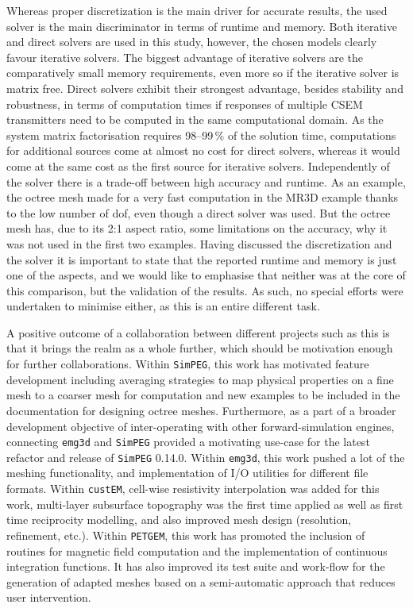 \documentclass[onecolumn,extra,camera]{gji}
\newcommand{\emg}[2]{\texttt{emg#1#2}\xspace}
\newcommand{\simpeg}{\texttt{SimPEG}\xspace}
\newcommand{\custem}{\texttt{custEM}\xspace}
\newcommand{\petgem}{\texttt{PETGEM}\xspace}
\begin{document}
Whereas proper discretization is the main driver for accurate results, the used solver is the main discriminator in terms of runtime and memory. Both iterative and direct solvers are used in this study, however, the chosen models clearly favour iterative solvers. The biggest advantage of iterative solvers are the comparatively small memory requirements, even more so if the iterative solver is matrix free. Direct solvers exhibit their strongest advantage, besides stability and robustness, in terms of computation times if responses of multiple CSEM transmitters need to be computed in the same computational domain. As the system matrix factorisation requires 98--99\,\% of the solution time, computations for additional sources come at almost no cost for direct solvers, whereas it would come at the same cost as the first source for iterative solvers. Independently of the solver there is a trade-off between high accuracy and runtime. As an example, the octree mesh made for a very fast computation in the MR3D example thanks to the low number of dof, even though a direct solver was used. But the octree mesh has, due to its 2:1 aspect ratio, some limitations on the accuracy, why it was not used in the first two examples. Having discussed the discretization and the solver it is important to state that the reported runtime and memory is just one of the aspects, and we would like to emphasise that neither was at the core of this comparison, but the validation of the results. As such, no special efforts were undertaken to minimise either, as this is an entire different task.

A positive outcome of a collaboration between different projects such as this is that it brings the realm as a whole further, which should be motivation enough for further collaborations. Within \simpeg, this work has motivated feature development including averaging strategies to map physical properties on a fine mesh to a coarser mesh for computation and new examples to be included in the documentation for designing octree meshes. Furthermore, as a part of a broader development objective of inter-operating with other forward-simulation engines, connecting \emg3d and \simpeg provided a motivating use-case for the latest refactor and release of \simpeg 0.14.0. Within \emg3d, this work pushed a lot of the meshing functionality, and implementation of I/O utilities for different file formats. Within \custem, cell-wise resistivity interpolation was added for this work, multi-layer subsurface topography was the first time applied as well as first time reciprocity modelling, and also improved mesh design (resolution, refinement, etc.). Within \petgem, this work has promoted the inclusion of routines for magnetic field computation and the implementation of continuous integration functions. It has also improved its test suite and work-flow for the generation of adapted meshes based on a semi-automatic approach that reduces user intervention.
\end{document}
